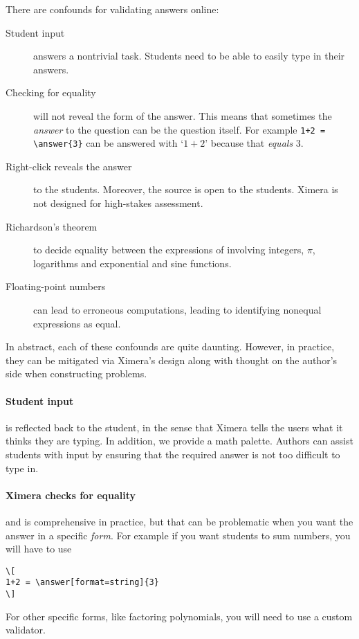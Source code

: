 \documentclass{ximera}
\begin{document}
\begin{warning}
  There are confounds for validating answers online:
  \begin{description}
    \item[Student input] answers a nontrivial task. Students need to be
      able
      to easily type in their answers.
    \item[Checking for equality] will not reveal the form of the answer. This
      means that sometimes the \textit{answer} to the question can be the
      question
      itself. For example  \verb!1+2 = \answer{3}! can be answered with `$1+2$'
      because
      that \textit{equals} $3$.
    \item[Right-click reveals the answer] to the students. Moreover, the source
      is open to the students. Ximera is not designed for high-stakes
      assessment.
      \item[Richardson's theorem ]
      to decide equality between the expressions of involving integers, $\pi$,
      logarithms and exponential and sine functions.
    \item[Floating-point numbers] can lead to erroneous computations, leading
      to
      identifying nonequal expressions as equal.
  \end{description}
\end{warning}
In abstract, each of these confounds are quite daunting. However, in practice,
they can be mitigated via Ximera's design along with thought on the author's
side when constructing problems.

\paragraph{Student input} is reflected back to the student, in the sense that
Ximera tells the users what it thinks they are typing.
In addition, we provide a math
palette. Authors can assist students with input by ensuring that the required
answer is not too difficult to type in.

\paragraph{Ximera checks for equality} and is comprehensive in
practice, but that can be problematic when you want the answer in a specific
\textit{form}. For example if you want students to sum numbers, you will have
to use
\begin{verbatim}
\[
1+2 = \answer[format=string]{3}
\]
\end{verbatim}
For other specific forms, like factoring polynomials, you will need to use a
custom validator.
\end{document}
